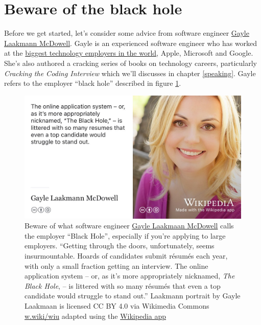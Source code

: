 \documentclass[
]{book}
\begin{document}
\hypertarget{blackhole}{%
\section{Beware of the black hole}\label{blackhole}}

Before we get started, let's consider some advice from software engineer \href{https://en.wikipedia.org/wiki/Gayle_Laakmann_McDowell}{Gayle Laakmann McDowell}. Gayle is an experienced software engineer who has worked at the \href{https://en.wikipedia.org/wiki/Big_Tech}{biggest technology employers in the world}, Apple, Microsoft and Google. She's also authored a cracking series of books on technology careers, particularly \emph{Cracking the Coding Interview} \citep{cracking} which we'll discusses in chapter \ref{speaking}. Gayle refers to the employer ``black hole'' described in figure \ref{fig:gayle-fig}.

\begin{figure}

{\centering \includegraphics[width=0.99\linewidth]{images/gayle-black-hole} 

}

\caption{Beware of what software engineer \href{https://en.wikipedia.org/wiki/Gayle_Laakmann_McDowell}{Gayle Laakmaan McDowell} calls the employer ``Black Hole'', especially if you're applying to large employers. ``Getting through the doors, unfortunately, seems insurmountable. Hoards of candidates submit résumés each year, with only a small fraction getting an interview. The online application system -- or, as it's more appropriately nicknamed, \emph{The Black Hole}, -- is littered with so many résumés that even a top candidate would struggle to stand out.'' \citep{blackhole, techcareer} Laakmann portrait by Gayle Laakmaan is licensed CC BY 4.0 via Wikimedia Commons \href{https://w.wiki/wiu}{w.wiki/wiu} adapted using the \href{https://apps.apple.com/us/app/wikipedia/id324715238}{Wikipedia app}}\label{fig:gayle-fig}
\end{figure}
\end{document}
